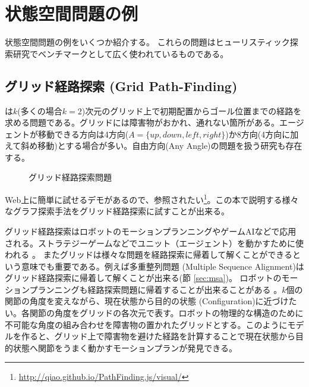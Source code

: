 \section{状態空間問題の例}
\label{sec:search-problem}

状態空間問題の例をいくつか紹介する。
これらの問題はヒューリスティック探索研究でベンチマークとして広く使われているものである。



\subsection{グリッド経路探索 (Grid Path-Finding)}

は$k$(多くの場合$k=2$)次元のグリッド上で初期配置からゴール位置までの経路を求める問題である\cite{yap2002grid}。グリッドには障害物がおかれ、通れない箇所がある。エージェントが移動できる方向は4方向($A= \{up, down, left, right\}$)か8方向(4方向に加えて斜め移動)とする場合が多い。自由方向(Any Angle)の問題を扱う研究も存在する\cite{nash2007theta}。

\begin{figure}
        \centering
        \begin{tikzpicture}[scale=0.5]
          
        \end{tikzpicture}
	\caption{グリッド経路探索問題}
	\label{fig:grid-pathfinding}
\end{figure}


Web上に簡単に試せるデモがあるので、参照されたい\footnote{\url{http://qiao.github.io/PathFinding.js/visual/}}。この本で説明する様々なグラフ探索手法をグリッド経路探索に試すことが出来る。%

グリッド経路探索はロボットのモーションプランニングやゲームAIなどで応用される\cite{algfoor2015comprehensive}。ストラテジーゲームなどでユニット（エージェント）を動かすために使われる \cite{cui2011based,sturtevant2012benchmarks}。%
またグリッドは様々な問題を経路探索に帰着して解くことができるという意味でも重要である。例えば多重整列問題 (Multiple Sequence Alignment)はグリッド経路探索に帰着して解くことが出来る(節 \ref{sec:msa})。
ロボットのモーションプランニングも経路探索問題に帰着することが出来ることがある \cite{barraquand91}。$k$個の関節の角度を変えながら、現在状態から目的の状態 (Configuration)に近づけたい。各関節の角度をグリッドの各次元で表す。ロボットの物理的な構造のために不可能な角度の組み合わせを障害物の置かれたグリッドとする。このようにモデルを作ると、グリッド上で障害物を避けた経路を計算することで現在状態から目的状態へ関節をうまく動かすモーションプランが発見できる。


